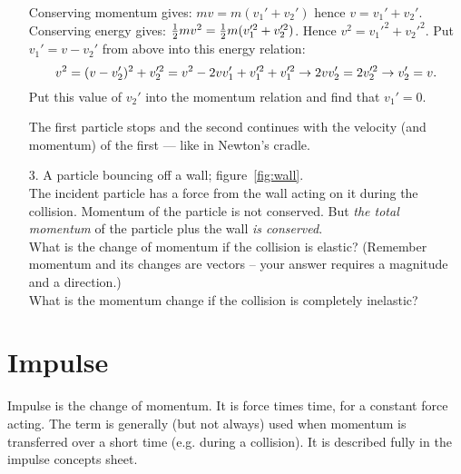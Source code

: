 \begin{itemize}
\item[] Conserving momentum gives: $m v = m (v_1' + v_2')$ hence $v = v_1' + v_2'$.\\
Conserving energy gives: ${\textstyle \frac{1}{2}} m v^2 = {\textstyle \frac{1}{2}} m (v_1'^2 + v_2'^2)$.  Hence
$v^2 = v_1'^2 + v_2'^2$.
\nl
Put $v_1'  = v - v_2'$ from above into this energy relation:
\begin{equation*} v^2 = (v - v_2')^2 + v_2'^2  = v^2 - 2 v v_1' +v_1'^2 + v_1'^2\nl
\rightarrow 2 v v_2' = 2 v_2'^2  \rightarrow v_2' = v .
\end{equation*}
Put this value of $v_2'$ into the momentum relation and find that $v_1' = 0$.\nl

The first particle stops and the second continues with the velocity (and momentum) of the first --- like in Newton's cradle.
\item[3.]  A particle bouncing off a wall; figure~\ref{fig:wall}.\\
The incident particle has a force from the wall acting on it during the collision.  Momentum of the particle is not conserved. But \textit{the total momentum} of the particle plus the wall \textit{is conserved}.\\
  What is the change of momentum if the collision is elastic? (Remember momentum and its changes are vectors -- your answer requires a magnitude and a direction.)\\
 What is the momentum change if the collision is completely inelastic?
\end{itemize}

\section{Impulse}
Impulse is the change of momentum.  It is force times time, for a constant force acting.  The term is generally (but not always) used when momentum is transferred over a short time (e.g. during a collision).  It is described fully in the impulse concepts sheet.


